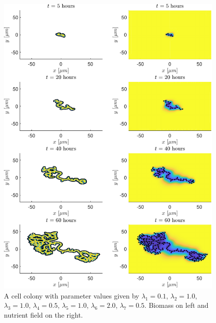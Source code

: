 \begin{figure}[!htb] %
    \centering
    \includegraphics[width= 1\textwidth]{
        chapter2/figures/t_all_L1_0o10_L2_1o00_L3_1o00_L4_0o50_L5_1o00_L6_2o00_L7_0o50.pdf}
    \caption{A cell colony with parameter values given by
             $\lambda_1 = 0.1$,  
             $\lambda_2 = 1.0$, 
             $\lambda_3 = 1.0$, 
             $\lambda_4 = 0.5$, 
             $\lambda_5 = 1.0$, 
             $\lambda_6 = 2.0$, 
             $\lambda_7 = 0.5$. 
             Biomass on left and nutrient field on the right.}
    \label{fig: sdsd}
\end{figure}

\newpage

